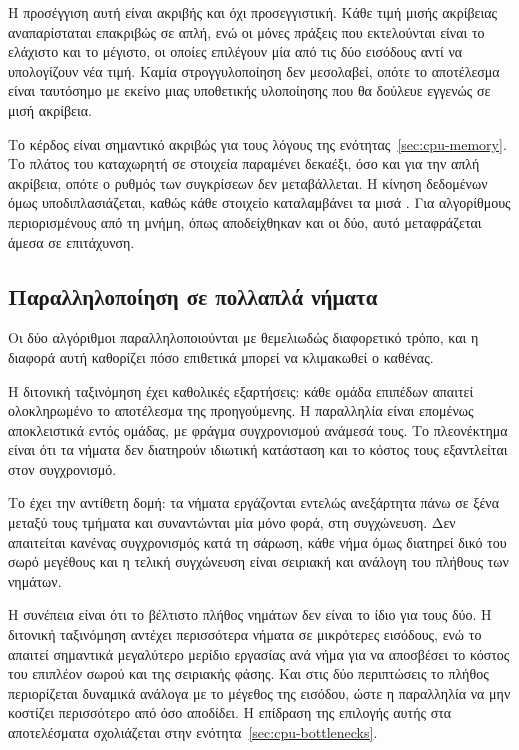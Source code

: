 

Η προσέγγιση αυτή είναι ακριβής και όχι προσεγγιστική. Κάθε τιμή μισής ακρίβειας
αναπαρίσταται επακριβώς σε απλή, ενώ οι μόνες πράξεις που εκτελούνται είναι το
ελάχιστο και το μέγιστο, οι οποίες επιλέγουν μία από τις δύο εισόδους αντί να
υπολογίζουν νέα τιμή. Καμία στρογγυλοποίηση δεν μεσολαβεί, οπότε το αποτέλεσμα
είναι ταυτόσημο με εκείνο μιας υποθετικής υλοποίησης που θα δούλευε εγγενώς σε
μισή ακρίβεια.

Το κέρδος είναι σημαντικό ακριβώς για τους λόγους της
ενότητας~\ref{sec:cpu-memory}. Το πλάτος του καταχωρητή σε στοιχεία παραμένει
δεκαέξι, όσο και για την απλή ακρίβεια, οπότε ο ρυθμός των συγκρίσεων δεν
μεταβάλλεται. Η κίνηση δεδομένων όμως υποδιπλασιάζεται, καθώς κάθε στοιχείο
καταλαμβάνει τα μισά . Για αλγορίθμους περιορισμένους από τη μνήμη,
όπως αποδείχθηκαν και οι δύο, αυτό μεταφράζεται άμεσα σε επιτάχυνση.

\subsection{Παραλληλοποίηση σε πολλαπλά νήματα}
\label{sec:cpu-threads}

Οι δύο αλγόριθμοι παραλληλοποιούνται με θεμελιωδώς διαφορετικό τρόπο, και η
διαφορά αυτή καθορίζει πόσο επιθετικά μπορεί να κλιμακωθεί ο καθένας.

Η διτονική ταξινόμηση έχει καθολικές εξαρτήσεις: κάθε ομάδα επιπέδων απαιτεί
ολοκληρωμένο το αποτέλεσμα της προηγούμενης. Η παραλληλία είναι επομένως
αποκλειστικά εντός ομάδας, με φράγμα συγχρονισμού ανάμεσά τους. Το πλεονέκτημα
είναι ότι τα νήματα δεν διατηρούν ιδιωτική κατάσταση και το κόστος τους
εξαντλείται στον συγχρονισμό.

Το  έχει την αντίθετη δομή: τα νήματα εργάζονται εντελώς
ανεξάρτητα πάνω σε ξένα μεταξύ τους τμήματα και συναντώνται μία μόνο φορά, στη
συγχώνευση. Δεν απαιτείται κανένας συγχρονισμός κατά τη σάρωση, κάθε νήμα όμως
διατηρεί δικό του σωρό μεγέθους  και η τελική συγχώνευση είναι σειριακή
και ανάλογη του πλήθους των νημάτων.

Η συνέπεια είναι ότι το βέλτιστο πλήθος νημάτων δεν είναι το ίδιο για τους δύο.
Η διτονική ταξινόμηση αντέχει περισσότερα νήματα σε μικρότερες εισόδους, ενώ το
 απαιτεί σημαντικά μεγαλύτερο μερίδιο εργασίας ανά νήμα για να
αποσβέσει το κόστος του επιπλέον σωρού και της σειριακής φάσης. Και στις δύο
περιπτώσεις το πλήθος περιορίζεται δυναμικά ανάλογα με το μέγεθος της εισόδου,
ώστε η παραλληλία να μην κοστίζει περισσότερο από όσο αποδίδει. Η επίδραση της
επιλογής αυτής στα αποτελέσματα σχολιάζεται στην
ενότητα~\ref{sec:cpu-bottlenecks}.

